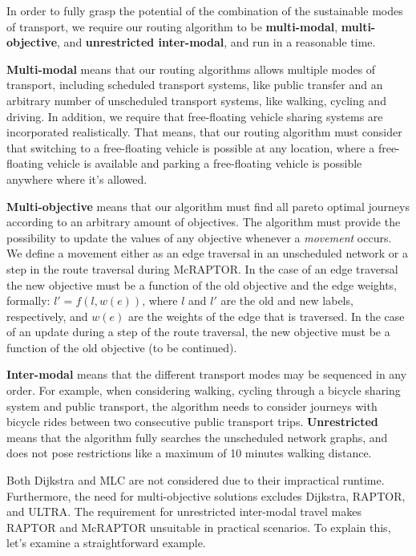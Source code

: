 In order to fully grasp the potential of the combination of the sustainable modes of transport, we require our routing algorithm to be \textbf{multi-modal}, \textbf{multi-objective}, and \textbf{unrestricted inter-modal}, and run in a reasonable time.

\textbf{Multi-modal} means that our routing algorithms allows multiple modes of transport, including scheduled transport systems, like public transfer and an arbitrary number of unscheduled transport systems, like walking, cycling and driving.
In addition, we require that free-floating vehicle sharing systems are incorporated realistically.
That means, that our routing algorithm must consider that switching to a free-floating vehicle is possible at any location, where a free-floating vehicle is available and parking a free-floating vehicle is possible anywhere where it's allowed.

\textbf{Multi-objective} means that our algorithm must find all pareto optimal journeys according to an arbitrary amount of objectives.
The algorithm must provide the possibility to update the values of any objective whenever a \textit{movement} occurs.
We define a movement either as an edge traversal in an unscheduled network or a step in the route traversal during McRAPTOR.
In the case of an edge traversal the new objective must be a function of the old objective and the edge weights, formally: \(l' = f(l, w(e))\), where \(l\) and \(l'\) are the old and new labels, respectively, and \(w(e)\) are the weights of the edge that is traversed.
In the case of an update during a step of the route traversal, the new objective must be a function of the old objective (to be continued).

\textbf{Inter-modal} means that the different transport modes may be sequenced in any order.
For example, when considering walking, cycling through a bicycle sharing system and public transport, the algorithm needs to consider journeys with bicycle rides between two consecutive public transport trips.
\textbf{Unrestricted} means that the algorithm fully searches the unscheduled network graphs, and does not pose restrictions like a maximum of 10 minutes walking distance.


Both Dijkstra and MLC are not considered due to their impractical runtime.
Furthermore, the need for multi-objective solutions excludes Dijkstra, RAPTOR, and ULTRA.
The requirement for unrestricted inter-modal travel makes RAPTOR and McRAPTOR unsuitable in practical scenarios.
To explain this, let's examine a straightforward example.

